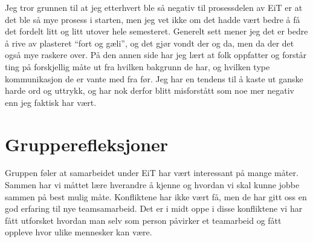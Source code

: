 Jeg tror grunnen til at jeg etterhvert ble så negativ til prosessdelen av EiT 
er at det ble så mye prosess i starten, men jeg vet ikke om det hadde vært bedre å få 
det fordelt litt og litt utover hele semesteret. Generelt sett mener jeg det er 
bedre å rive av plasteret ``fort og gæli'', og det gjør vondt der og da, men 
da der det også mye raskere over. 
På den annen side har jeg lært at folk oppfatter og forstår ting på forskjellig måte ut fra 
hvilken bakgrunn de har, og hvilken type kommunikasjon de er vante med fra før.
Jeg har en tendens til å kaste ut ganske harde ord og uttrykk, og har nok 
derfor blitt misforstått som noe mer negativ enn jeg faktisk har vært. 

\section{Grupperefleksjoner}

Gruppen føler at samarbeidet under EiT har vært interessant på mange måter. Sammen har vi måttet lære
hverandre å kjenne og hvordan vi skal kunne jobbe sammen på best mulig måte. Konfliktene har ikke vært få,
men de har gitt oss en god erfaring til nye teamsamarbeid. Det er i midt oppe i disse konfliktene vi har fått
utforsket hvordan man selv som person påvirker et teamarbeid og fått oppleve hvor ulike mennesker kan være. 

